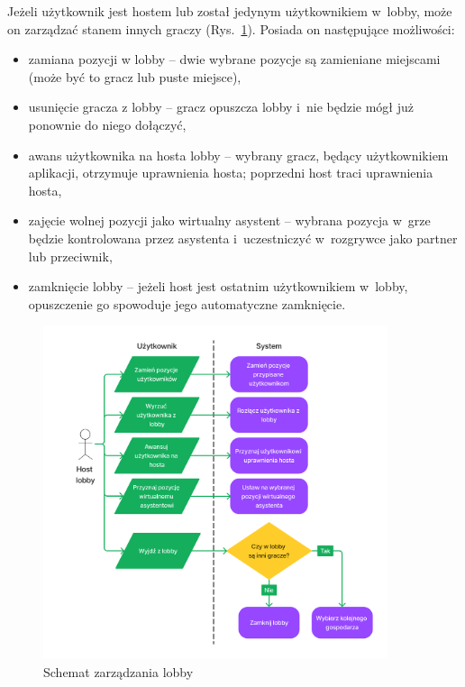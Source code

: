 Jeżeli użytkownik jest hostem lub został jedynym
użytkownikiem w~lobby, może on zarządzać stanem innych graczy (Rys.~\ref{fig:figma_xd_manage_lobby}).
Posiada on następujące możliwości:
\begin{itemize}
    \item zamiana pozycji w lobby -- dwie wybrane pozycje są zamieniane miejscami
          (może być to gracz lub puste miejsce),
    \item usunięcie gracza z lobby -- gracz opuszcza lobby i~nie będzie
          mógł już ponownie do niego dołączyć,
    \item awans użytkownika na hosta lobby -- wybrany gracz, będący użytkownikiem
          aplikacji, otrzymuje uprawnienia hosta; poprzedni host traci uprawnienia hosta,
    \item zajęcie wolnej pozycji jako wirtualny asystent -- wybrana pozycja
          w~grze będzie kontrolowana przez asystenta
          i~uczestniczyć w~rozgrywce jako partner lub przeciwnik,
    \item zamknięcie lobby -- jeżeli host jest ostatnim
          użytkownikiem w~lobby, opuszczenie go spowoduje jego automatyczne
          zamknięcie.

\end{itemize}

\begin{figure}[hbt!]
    \centering
    \includegraphics[width=0.9\textwidth]{img/schematy/manage_lobby.png}
    \caption{Schemat zarządzania lobby}
    \label{fig:figma_xd_manage_lobby}
\end{figure}

